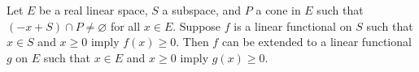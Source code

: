 Let $E$ be a real linear space, $S$ a subspace, and $P$ a cone in $E$ such that $(-x + S) \cap P \neq \varnothing$ for all $x \in E$. Suppose $f$ is a linear functional on $S$ such that $x \in S$ and $x \geq 0$ imply $f(x) \geq 0$. Then $f$ can be extended to a linear functional $g$ on $E$ such that $x \in E$ and $x \geq 0$ imply $g(x) \geq 0$.
